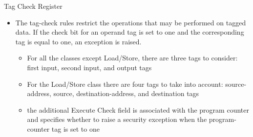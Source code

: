 \begin{frame}[noframenumbering]{Tag Check Register}
    \begin{table}[!t]
        \centering
        \caption{Tag Check Register configuration}
        \label{tab:tcr}
    \end{table}

    \begin{itemize}
        \justifying
        \item The tag-check rules restrict the operations that may be performed on tagged data. If the check bit for an operand tag is set to one and the corresponding tag is equal to one, an exception is raised.
              \begin{itemize}
                  \justifying
                  \item For all the classes except Load/Store, there are three tags to consider: first input, second input, and output tags
                  \item For the Load/Store class there are four tags to take into account: source-address, source, destination-address, and destination tags
                  \item the additional Execute Check field is associated with the program counter and specifies whether to raise a security exception when the program-counter tag is set to one
              \end{itemize}
    \end{itemize}
\end{frame}
